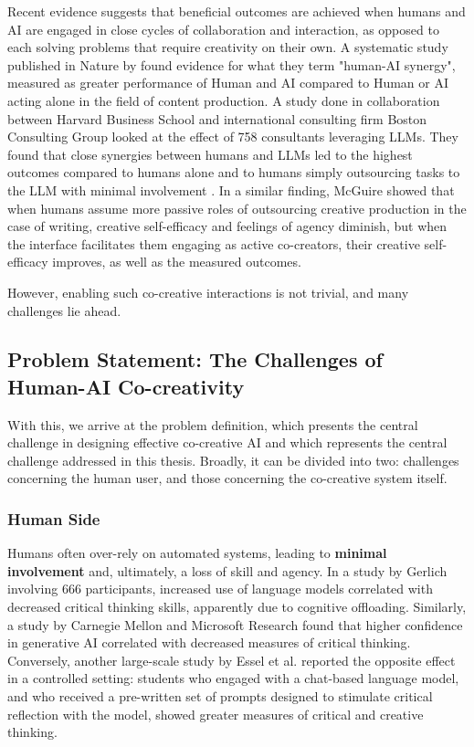 Recent evidence suggests that beneficial outcomes are achieved when humans and AI are engaged in close cycles of collaboration and interaction, as opposed to each solving problems that require creativity on their own. A systematic study published in Nature by \cite{Vaccaro2024-ne} found evidence for what they term "human-AI synergy", measured as greater performance of Human and AI compared to Human or AI acting alone in the field of content production. A study done in collaboration between Harvard Business School and international consulting firm Boston Consulting Group looked at the effect of 758 consultants leveraging LLMs. They found that close synergies between humans and LLMs led to the highest outcomes compared to humans alone and to humans simply outsourcing tasks to the LLM with minimal involvement \cite{DellAcqua2023-og}. In a similar finding, McGuire \cite{McGuire2024-im} showed that when humans assume more passive roles of outsourcing creative production in  the case of writing, creative self-efficacy and feelings of agency diminish, but when the interface facilitates them engaging as active co-creators, their creative self-efficacy improves, as well as the measured outcomes. 

However, enabling such co-creative interactions is not trivial, and many challenges lie ahead. 

\subsection{Problem Statement: The Challenges of Human-AI Co-creativity}

With this, we arrive at the problem definition, which presents the central challenge in designing effective co-creative AI and which represents the central challenge addressed in this thesis. Broadly, it can be divided into two: challenges concerning the human user, and those concerning the co-creative system itself.

\subsubsection{Human Side}

Humans often over-rely on automated systems, leading to \textbf{minimal involvement} and, ultimately, a loss of skill and agency. In a study by Gerlich \cite{Gerlich2025-as} involving 666 participants, increased use of language models correlated with decreased critical thinking skills, apparently due to cognitive offloading. Similarly, a study by Carnegie Mellon and Microsoft Research found \cite{Lee2025-dw} that higher confidence in generative AI correlated with decreased measures of critical thinking. Conversely, another large-scale study by Essel et al. \cite{Essel2024-qc} reported the opposite effect in a controlled setting: students who engaged with a chat-based language model, and who received a pre-written set of prompts designed to stimulate critical reflection with the model, showed greater measures of critical and creative thinking.

